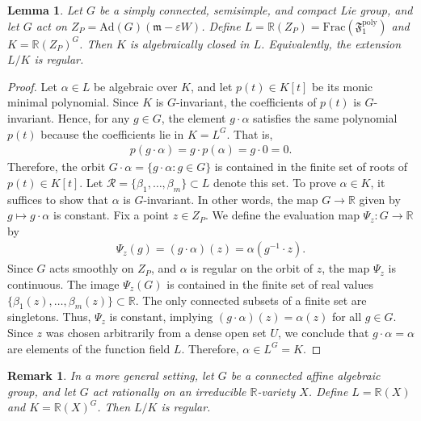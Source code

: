 \documentclass[11pt]{amsart}
\newtheorem{lemma}[theorem]{Lemma}
\theoremstyle{definition}
\theoremstyle{plain}
\newtheorem{remark}[theorem]{Remark}
\theoremstyle{conclusion}
\begin{document}
\begin{lemma} \label{lem:invalgclose}
Let $G$ be a simply connected, semisimple, and compact Lie group, and let $G$ act on $ Z_P = \mathrm{Ad}(G)(\mathfrak{m} - \varepsilon W)$. Define $L  = \mathbb{R}( Z_P) = \mathrm{Frac}\left(\mathfrak{F}_1^{\mathrm{poly}}\right)$ and $K  = \mathbb{R}( Z_P)^G$. Then $K$ is algebraically closed in $L$. Equivalently, the extension $L/K$ is regular.
\end{lemma}

\begin{proof}
Let $\alpha\in L$ be algebraic over $K$, and let $p(t)\in K[t]$ be its monic minimal polynomial. Since $K$ is $G$-invariant, the coefficients of $p(t)$ is $G$-invariant. Hence, for any $g\in G$, the element $g\cdot \alpha$ satisfies the same polynomial $p(t)$ because the coefficients lie in $K=L^G$. That is, \begin{align*}
    p(g\cdot \alpha) = g \cdot p(\alpha) = g \cdot 0 = 0.
\end{align*} Therefore, the orbit $G\cdot\alpha = \{g \cdot \alpha: g \in G\}$ is contained in the finite set of roots of $p(t)  \in K[t]$.  Let $\mathcal{R} = \{\beta_1, \dots, \beta_m\} \subset L$ denote this set. To prove $\alpha \in K$, it suffices to show that $\alpha$ is $G$-invariant. In other words, the map $G \to \mathbb{R}$ given by $g \mapsto g \cdot \alpha$ is constant. %
Fix a point $z \in Z_P$. We define the evaluation map $\Psi_z: G \to \mathbb{R}$ by \begin{align*}
    \Psi_z(g) = (g \cdot \alpha)(z) = \alpha(g^{-1} \cdot z).
\end{align*}  Since $G$ acts smoothly on $Z_P$, and $\alpha$ is regular on the orbit of $z$, the map $\Psi_z$ is continuous. The image $\Psi_z(G)$ is contained in the finite set of real values $\{\beta_1(z), \dots, \beta_m(z)\} \subset \mathbb{R}$. %
The only connected subsets of a finite set are singletons. Thus, $\Psi_z$ is constant, implying $(g \cdot \alpha)(z) = \alpha(z)$ for all $g \in G$. Since $z$ was chosen arbitrarily from a dense open set $U$, we conclude that $g \cdot \alpha = \alpha$ are elements of the function field $L$. Therefore, $\alpha \in L^G = K$.
\end{proof}

\begin{remark}
In a more general setting, let $G$ be a connected affine algebraic group, and let $G$ act rationally on an irreducible $\mathbb{R}$-variety $X$. Define $L  = \mathbb{R}(X)$ and $K  = \mathbb{R}(X)^G$. Then $L/K$ is regular.   %
\end{remark}
\end{document}
